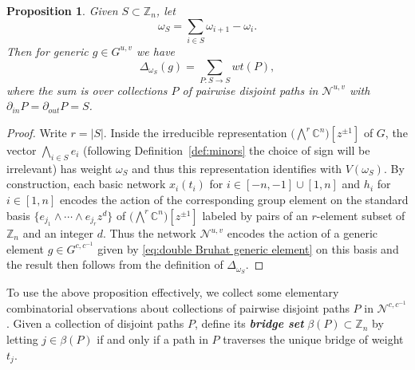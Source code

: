 \documentclass[12pt]{amsart}
\newcommand{\newword}[1]{\textbf{\emph{#1}}}
\newcommand{\CC}{\mathbb{C}}
\newcommand{\ZZ}{\mathbb{Z}}
\newcommand{\cN}{\mathcal{N}} %
\newtheorem{proposition}[theorem]{Proposition}
\theoremstyle{remark}
\numberwithin{equation}{section}
\begin{document}
\begin{proposition}\label{prop:minorsfrompaths}
  Given $S \subset \ZZ_n$, let
  \[ \omega_S = \sum_{i \in S} \omega_{i+1} - \omega_i.\] 
  Then for generic $g\in G^{u,v}$ we have \[ \Delta_{\omega_S}(g) = \sum_{P: S \to S} wt(P), \]
  where the sum is over collections $P$ of pairwise disjoint paths in $\cN^{u,v}$ with $\partial_{in}P = \partial_{out}P = S$.
\end{proposition}
\begin{proof}
  Write $r=|S|$.  
  Inside the irreducible representation $\big(\!\bigwedge^{\!r}\CC^n\big)[z^{\pm 1}]$ of $G$, the vector $\bigwedge\limits_{i\in S} e_i$ (following Definition~\ref{def:minors} the choice of sign will be irrelevant) has weight $\omega_S$ and thus this representation identifies with $V(\omega_S)$.
  By construction, each basic network $x_i(t_i)$ for $i\in[-n,-1]\cup[1,n]$ and $h_i$ for $i\in[1,n]$ encodes the action of the corresponding group element on the standard basis $\{ e_{j_1} \wedge \cdots \wedge e_{j_r} z^d\}$ of $\big(\!\bigwedge^{\!r}\CC^n\big)[z^{\pm 1}]$ labeled by pairs of an $r$-element subset of $\ZZ_n$ and an integer $d$.  Thus the network $\cN^{u,v}$ encodes the action of a generic element $g\in G^{c,c^{-1}}$ given by \eqref{eq:double Bruhat generic element} on this basis and the result then follows from the definition of $\Delta_{\omega_S}$.
\end{proof}

To use the above proposition effectively, we collect some elementary combinatorial observations about collections of pairwise disjoint paths $P$ in $\cN^{c,c^{-1}}$. 
Given a collection of disjoint paths $P$, define its \newword{bridge set} $\beta(P)\subset\ZZ_n$ by letting $j\in\beta(P)$ if and only if a path in $P$ traverses the unique bridge of weight $t_j$.
\end{document}
